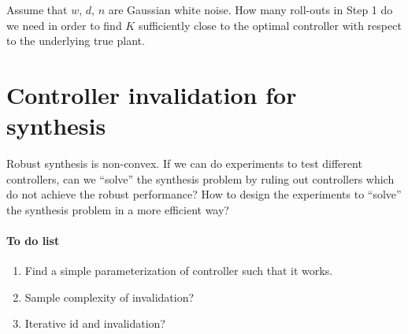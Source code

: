 \documentclass[11pt, onecolumn]{article}
\begin{document}
Assume that $w$, $d$, $n$ are Gaussian white noise. How many roll-outs in Step 1 do we need in order
to find $K$ sufficiently close to the optimal controller with respect to the underlying true plant.






\newpage



\section{Controller invalidation for synthesis}
Robust synthesis is non-convex.  If we can do experiments to test different controllers, can we
``solve'' the synthesis problem by ruling out controllers which do not achieve the robust
performance? How to design the experiments to ``solve'' the synthesis problem in a more efficient
way?


\paragraph{To do list }
\begin{enumerate}
\item Find a simple parameterization of controller such that it works.
\item Sample complexity of invalidation?
\item Iterative id and invalidation?
\end{enumerate}
\end{document}
